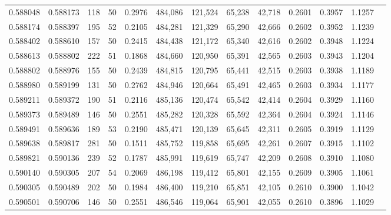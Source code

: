 \begin{tabular}{rrrrrrrrrrrrr}
0.588048 & 0.588173 &   118 &  50 &                                     0.2976 & 484,086 & 121,524 &  65,238 &  42,718 & 0.2601 & 0.3957 & 1.1257 \\
0.588174 & 0.588397 &   195 &  52 &                                     0.2105 & 484,281 & 121,329 &  65,290 &  42,666 & 0.2602 & 0.3952 & 1.1239 \\
0.588402 & 0.588610 &   157 &  50 &                                     0.2415 & 484,438 & 121,172 &  65,340 &  42,616 & 0.2602 & 0.3948 & 1.1224 \\
0.588613 & 0.588802 &   222 &  51 &                                     0.1868 & 484,660 & 120,950 &  65,391 &  42,565 & 0.2603 & 0.3943 & 1.1204 \\
0.588802 & 0.588976 &   155 &  50 &                                     0.2439 & 484,815 & 120,795 &  65,441 &  42,515 & 0.2603 & 0.3938 & 1.1189 \\
0.588980 & 0.589199 &   131 &  50 &                                     0.2762 & 484,946 & 120,664 &  65,491 &  42,465 & 0.2603 & 0.3934 & 1.1177 \\
0.589211 & 0.589372 &   190 &  51 &                                     0.2116 & 485,136 & 120,474 &  65,542 &  42,414 & 0.2604 & 0.3929 & 1.1160 \\
0.589373 & 0.589489 &   146 &  50 &                                     0.2551 & 485,282 & 120,328 &  65,592 &  42,364 & 0.2604 & 0.3924 & 1.1146 \\
0.589491 & 0.589636 &   189 &  53 &                                     0.2190 & 485,471 & 120,139 &  65,645 &  42,311 & 0.2605 & 0.3919 & 1.1129 \\
0.589638 & 0.589817 &   281 &  50 &                                     0.1511 & 485,752 & 119,858 &  65,695 &  42,261 & 0.2607 & 0.3915 & 1.1102 \\
0.589821 & 0.590136 &   239 &  52 &                                     0.1787 & 485,991 & 119,619 &  65,747 &  42,209 & 0.2608 & 0.3910 & 1.1080 \\
0.590140 & 0.590305 &   207 &  54 &                                     0.2069 & 486,198 & 119,412 &  65,801 &  42,155 & 0.2609 & 0.3905 & 1.1061 \\
0.590305 & 0.590489 &   202 &  50 &                                     0.1984 & 486,400 & 119,210 &  65,851 &  42,105 & 0.2610 & 0.3900 & 1.1042 \\
0.590501 & 0.590706 &   146 &  50 &                                     0.2551 & 486,546 & 119,064 &  65,901 &  42,055 & 0.2610 & 0.3896 & 1.1029 \\

\end{tabular}

